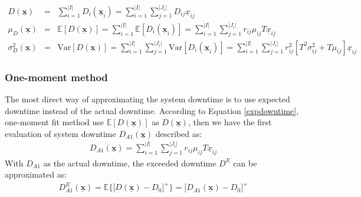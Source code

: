 \documentclass[preprint,12pt]{elsarticle}
\begin{document}
\begin{eqnarray}
D(\boldsymbol{\underline{x}}) &=& \sum_{i=1}^{\lvert I \rvert}D_{i}(\boldsymbol{\underline{x}}_{i})
=\sum_{i=1}^{\lvert I \rvert}\sum_{j=1}^{\lvert J_{i}\rvert}{D_{ij}\underline{x}_{ij}}  \\
\mu_{D}(\boldsymbol{\underline{x}})&=&\mathbb{E}[D(\boldsymbol{\underline{x}})] = \sum^{\lvert I \rvert}_{i=1}\mathbb{E}[D_{i}(\boldsymbol{\underline{x}}_{i})] = \sum^{\lvert I \rvert}_{i=1} \sum_{j=1}^{\lvert J_{i} \rvert}{r_{ij}\mu_{ij}T\underline{x}_{ij}} \label{expdowntime}\\
\sigma^{2}_{D}(\boldsymbol{\underline{x}})&=&\textrm{Var}[D(\boldsymbol{\underline{x}})] = \sum_{i=1}^{\lvert I \rvert} \sum_{j=1}^{\lvert J_{i} \rvert}\textrm{Var}[D_{i}(\boldsymbol{\underline{x}}_{i})] = \sum_{i=1}^{\lvert I \rvert}\sum_{j=1}^{\lvert J_{i} \rvert}r_{ij}^{2}[T^{2}\sigma^{2}_{ij}+T\mu_{ij}]\underline{x}_{ij} \label{vardowntime}
\end{eqnarray}
\normalsize
%
\subsubsection{One-moment method}

The most direct way of approximating the system downtime is to use expected downtime instead of the actual downtime. According to Equation \eqref{expdowntime}, one-moment fit method use $\mathbb{E}[D(\boldsymbol{\underline{x}})]$ as $D(\boldsymbol{\underline{x}})$, then we have the first evaluation of system downtime $D_{A1}(\boldsymbol{\underline{x}})$ described as:
\small
\begin{eqnarray}
D_{A1}(\boldsymbol{\underline{x}}) = \sum^{\lvert I \rvert}_{i=1} \sum_{j=1}^{\lvert J_{i} \rvert}{r_{ij}\mu_{ij}T\underline{x}_{ij}}
\label{approximation1}
\end{eqnarray}
\normalsize
With $D_{A1}$ as the actual downtime, the exceeded downtime $D^{E}$ can be approximated as:
\begin{eqnarray}
D^{E}_{A1}(\boldsymbol{\underline{x}}) =\mathbb{E}\bigg\{\bigg[D(\boldsymbol{\underline{x}})-D_{0}\bigg]^{+}\bigg\} = \bigg[D_{A1}(\boldsymbol{\underline{x}})-D_{0} \bigg]^{+} \label{penapproximation1}
\end{eqnarray}
\end{document}
